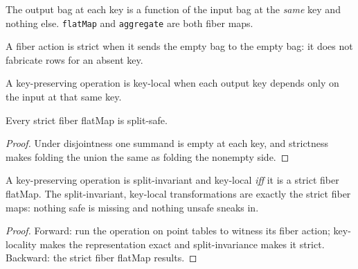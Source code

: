 \begin{definition}
  \label{def:fibermap}\leanok
  The output bag at each key is a function of the input bag at the
  \emph{same} key and nothing else.  \texttt{flatMap} and \texttt{aggregate}
  are both fiber maps.
\end{definition}

\begin{definition}
  \label{def:strict}\leanok
  A fiber action is strict when it sends the empty bag to the empty bag:
  it does not fabricate rows for an absent key.
\end{definition}

\begin{definition}
  \label{def:keylocal}\leanok
  A key-preserving operation is key-local when each output key depends
  only on the input at that same key.
\end{definition}

\begin{theorem}
  \label{thm:fibermap-splitsafe}\leanok
  Every strict fiber flatMap is split-safe.
\end{theorem}
\begin{proof}\leanok
  Under disjointness one summand is empty at each key, and strictness
  makes folding the union the same as folding the nonempty side.
\end{proof}

\begin{theorem}
  \label{thm:fibermap-iff}\leanok
  A key-preserving operation is split-invariant and key-local \emph{iff}
  it is a strict fiber flatMap.  The split-invariant, key-local
  transformations are exactly the strict fiber maps: nothing safe is
  missing and nothing unsafe sneaks in.
\end{theorem}
\begin{proof}\leanok
  Forward: run the operation on point tables to witness its fiber
  action; key-locality makes the representation exact and
  split-invariance makes it strict.  Backward: the strict fiber flatMap
  results.
\end{proof}

